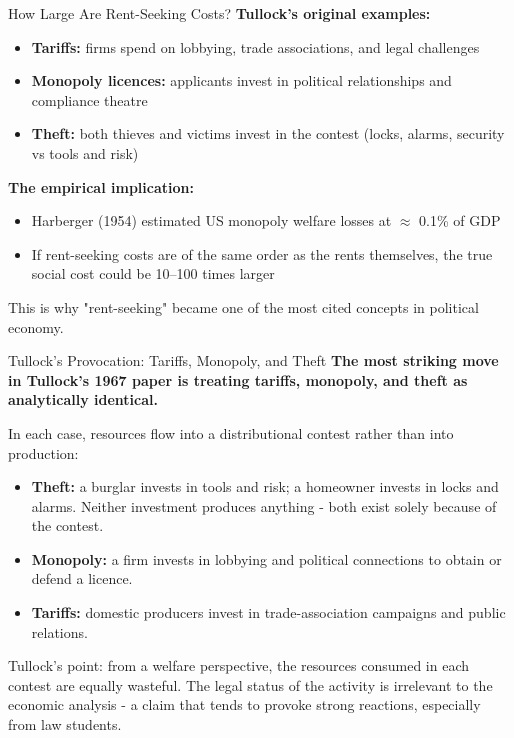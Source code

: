 \documentclass[10pt]{beamer}
\begin{document}
\begin{frame}{How Large Are Rent-Seeking Costs?}
\textbf{Tullock's original examples:}

\begin{itemize}
\item \textbf{Tariffs:} firms spend on lobbying, trade associations, and legal challenges
\item \textbf{Monopoly licences:} applicants invest in political relationships and compliance theatre
\item \textbf{Theft:} both thieves and victims invest in the contest (locks, alarms, security vs tools and risk)
\end{itemize}

\vspace{0.1cm}
\textbf{The empirical implication:}
\begin{itemize}
\item Harberger (1954) estimated US monopoly welfare losses at $\approx$ 0.1\% of GDP
\item If rent-seeking costs are of the same order as the rents themselves, the true social cost could be \alert{10--100 times larger}
\end{itemize}

\vspace{0.1cm}
\footnotesize
\alert{This is why "rent-seeking" became one of the most cited concepts in political economy.}
\end{frame}


\begin{frame}{Tullock's Provocation: Tariffs, Monopoly, and Theft}
\textbf{The most striking move in Tullock's 1967 paper is treating tariffs, monopoly, and theft as analytically identical.}

\vspace{0.1cm}
In each case, resources flow into a \alert{distributional contest} rather than into production:

\vspace{0.1cm}
\begin{itemize}
\item \textbf{Theft:} a burglar invests in tools and risk; a homeowner invests in locks and alarms.
Neither investment produces anything - both exist solely because of the contest.

\item \textbf{Monopoly:} a firm invests in lobbying and political connections to obtain or defend a licence.

\item \textbf{Tariffs:} domestic producers invest in trade-association campaigns and public relations.
\end{itemize}

\vspace{0.1cm}
\alert{Tullock's point:} from a welfare perspective, the resources consumed in each contest are equally wasteful.
The legal status of the activity is irrelevant to the economic analysis - a claim that tends to provoke strong reactions, especially from law students.
\end{frame}
\end{document}
